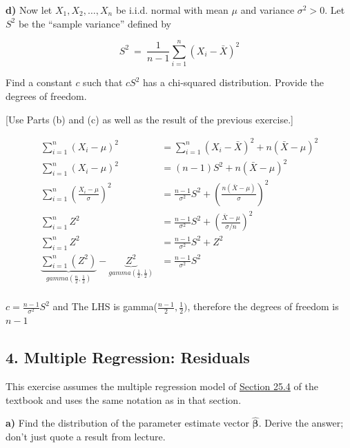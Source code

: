 \documentclass[11pt]{article}
\begin{document}
\textbf{d)} Now let \(X_1, X_2, \ldots , X_n\) be i.i.d. normal with
mean \(\mu\) and variance \(\sigma^2 > 0\). Let \(S^2\) be the ``sample
variance'' defined by

\[
S^2 ~=~ \frac{1}{n-1} \sum_{i=1}^n (X_i - \bar{X})^2
\]

Find a constant \(c\) such that \(cS^2\) has a chi-squared distribution.
Provide the degrees of freedom.

{[}Use Parts (b) and (c) as well as the result of the previous
exercise.{]}

\begin{align*}
	\sum_{i=1}^{n}(X_{i} - \mu)^{2} &= \sum_{i=1}^{n}(X_{i}- \bar X)^{2} + n(\bar X - \mu )^{2} \\
	\sum_{i=1}^{n} (X_{i} - \mu )^{2} &=  (n-1)S^{2} + n(\bar X - \mu )^{2} \\
	\sum_{i=1}^{n} \left( \frac{X_{i} - \mu }{\sigma} \right)^{2} &= \frac{n-1}{\sigma^{2}}S^{2} + \left(\frac{n(\bar X - \mu )}{\sigma}\right)^{2} \\
	\sum_{i=1}^{n}Z^{2}  &= \frac{n-1}{\sigma^{2}} S^{2} + \left( \frac{\bar X - \mu }{\sigma / n} \right) ^{2} \\
	\sum_{i=1}^{n} Z^{2} &= \frac{n-1}{\sigma^{2}} S^{2} + Z^{2} \\
	\underbrace{	\sum_{i=1}^{n} (Z^{2})}_{gamma(\frac{n}{2}, \frac{1}{2})} - \underbrace{Z^{2}}_{gamma(\frac{1}{2}, \frac{1}{2})} &= \frac{n-1}{\sigma^{2}}S^{2} \\
\end{align*}


$c = \frac{n-1}{\sigma^{2}} S^{2}$ and The LHS is gamma($\frac{n-1}{2}, \frac{1}{2})$, therefore the degrees of freedom is $n-1$ 


    \newpage

    \hypertarget{multiple-regression-residuals}{%
\subsection{4. Multiple Regression:
Residuals}\label{multiple-regression-residuals}}

This exercise assumes the multiple regression model of
\href{https://data140.org/textbook/content/chapter-25/multiple-regression-1/}{Section
25.4} of the textbook and uses the same notation as in that section.

\textbf{a)} Find the distribution of the parameter estimate vector
\(\hat{\boldsymbol{\beta}}\). Derive the answer; don't just quote a
result from lecture.
\end{document}
